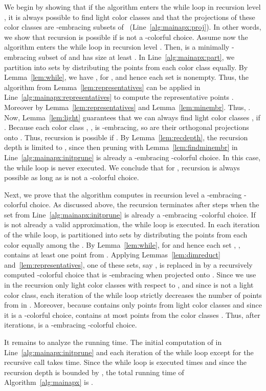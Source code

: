 \begin{prf}
We begin by showing that if the algorithm enters the while 
loop in recursion level , it is always possible to find  light color classes and that the projections
 of these color
classes are -embracing subsets of 
~(Line~\ref{alg:mainapx:proj}). In other words, we show
that recursion is possible if  is not a -colorful choice.
Assume now the algorithm enters the while loop in recursion level .
Then,  is a minimally -embracing subset of 
 and has size at least . In
Line~\ref{alg:mainapx:part}, we partition  into  sets 
 by distributing the points from each color class equally. 
By Lemma~\ref{lem:while}, we have , 
for ,
and hence each set  is nonempty. Thus,
the algorithm from Lemma~\ref{lem:representatives} can be applied in
Line~\ref{alg:mainapx:representatives}
to compute the representative points . Moreover  by Lemma~\ref{lem:representatives} and
Lemma~\ref{lem:minembr}.
Thus, .
Now, Lemma~\ref{lem:light} guarantees that we can always find  
light color classes , 
if . Because each color 
class , , is
-embracing, so are their orthogonal projections onto
. Thus, recursion is possible 
if . By Lemma~\ref{lem:recdepth}, 
the recursion depth is limited to
, since then pruning  with
Lemma~\ref{lem:findminembr} in Line~\ref{alg:mainapx:initprune} is already a
-embracing -colorful choice. In this case, the while loop is never
executed. We conclude that for , recursion is always
possible as long as  is not a -colorful choice.


Next, we prove that the algorithm computes in recursion level  a
-embracing -colorful choice. As discussed above, the
recursion terminates after  steps when
the set  from Line~\ref{alg:mainapx:initprune} is already a 
-embracing -colorful choice. If  is not already a 
valid approximation, the while loop is executed. In each 
iteration of the while loop,  is partitioned into  sets
 by distributing the points from each color 
equally among the . By Lemma~\ref{lem:while}, 
 for 
and hence each set , , contains at least one 
point from . Applying Lemmas~\ref{lem:dimreduct} 
and~\ref{lem:representatives}, one of these
sets, say , is replaced in   by a recursively computed
-colorful choice 
that is -embracing when projected onto .
Since we use in the recursion only light color classes with
respect to , and since  is not a light color class, 
each iteration of the while loop strictly decreases the number of 
points from  in .  Moreover, because  contains 
only points from light color classes and since it
is a -colorful choice, 
contains at most  points from the color classes .
Thus, after  iterations,  is a -embracing 
-colorful choice.

It remains to analyze the running time. The initial computation of  in
Line~\ref{alg:mainapx:initprune} and each iteration of the 
while loop except for the recursive call takes  time. 
Since the while loop is executed 
times and since the recursion depth is bounded by , the total running time of Algorithm~\ref{alg:mainapx} is 
.
\end{prf}

